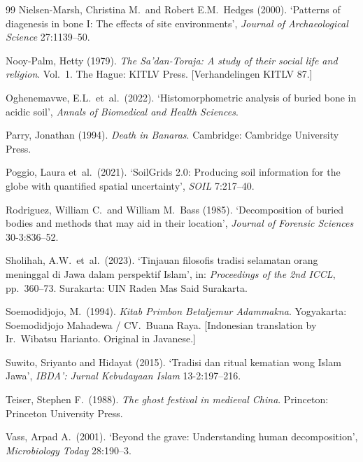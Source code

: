 \documentclass[12pt,a4paper]{article}
\begin{document}
\begin{thebibliography}{99}
Nielsen-Marsh, Christina M.\ and Robert E.M.\ Hedges (2000). `Patterns of diagenesis in bone I: The effects of site environments', \textit{Journal of Archaeological Science} 27:1139--50.

Nooy-Palm, Hetty (1979). \textit{The Sa'dan-Toraja: A study of their social life and religion}. Vol.\ 1. The Hague: KITLV Press. [Verhandelingen KITLV 87.]

Oghenemavwe, E.L.\ et~al.\ (2022). `Histomorphometric analysis of buried bone in acidic soil', \textit{Annals of Biomedical and Health Sciences}.

Parry, Jonathan (1994). \textit{Death in Banaras}. Cambridge: Cambridge University Press.

Poggio, Laura et~al.\ (2021). `SoilGrids 2.0: Producing soil information for the globe with quantified spatial uncertainty', \textit{SOIL} 7:217--40.

Rodriguez, William C.\ and William M.\ Bass (1985). `Decomposition of buried bodies and methods that may aid in their location', \textit{Journal of Forensic Sciences} 30-3:836--52.

Sholihah, A.W.\ et~al.\ (2023). `Tinjauan filosofis tradisi selamatan orang meninggal di Jawa dalam perspektif Islam', in: \textit{Proceedings of the 2nd ICCL}, pp.\ 360--73. Surakarta: UIN Raden Mas Said Surakarta.

Soemodidjojo, M.\ (1994). \textit{Kitab Primbon Betaljemur Adammakna}. Yogyakarta: Soemodidjojo Mahadewa / CV.\ Buana Raya. [Indonesian translation by Ir.\ Wibatsu Harianto. Original in Javanese.]

Suwito, Sriyanto and Hidayat (2015). `Tradisi dan ritual kematian wong Islam Jawa', \textit{IBDA': Jurnal Kebudayaan Islam} 13-2:197--216.

Teiser, Stephen F.\ (1988). \textit{The ghost festival in medieval China}. Princeton: Princeton University Press.

Vass, Arpad A.\ (2001). `Beyond the grave: Understanding human decomposition', \textit{Microbiology Today} 28:190--3.


\end{thebibliography}
\end{document}

